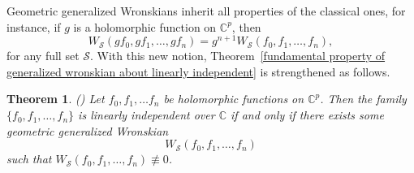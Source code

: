 \documentclass[english, 12pt]{amsart}
\theoremstyle{plain}
\newtheorem{thm}{Theorem}[section]
\theoremstyle{remark}
\numberwithin{equation}{section}
\theoremstyle{plain}
\theoremstyle{named}
\begin{document}
Geometric generalized Wronskians inherit all properties of the classical ones, for instance, if $g$ is a holomorphic function on $\mathbb{C}^p$, then
$$
W_{\mathcal{S}}(gf_0,gf_1,\dots,gf_n)
=
g^{n+1}
W_{\mathcal{S}}(f_0,f_1,\dots,f_n),
$$
for any full set $\mathcal{S}$. With this new notion, Theorem~\ref{fundamental property of generalized wronskian about linearly independent} is strengthened as follows.
\begin{thm}(\cite[Theorem 1.4.1]{Etesse2023})
\label{etesse observation}
Let $f_0,f_1,\dots f_n$ be holomorphic functions on $\mathbb{C}^p$. Then the family $\{f_0,f_1,\dots,f_n\}$ is linearly independent over $\mathbb{C}$ if and only if there exists some geometric generalized Wronskian $$W_{\mathcal{S}}(f_0,f_1,\dots,f_n)$$  such that $W_{\mathcal{S}}(f_0,f_1,\dots,f_n)\not\equiv 0$.
\end{thm}
\end{document}
